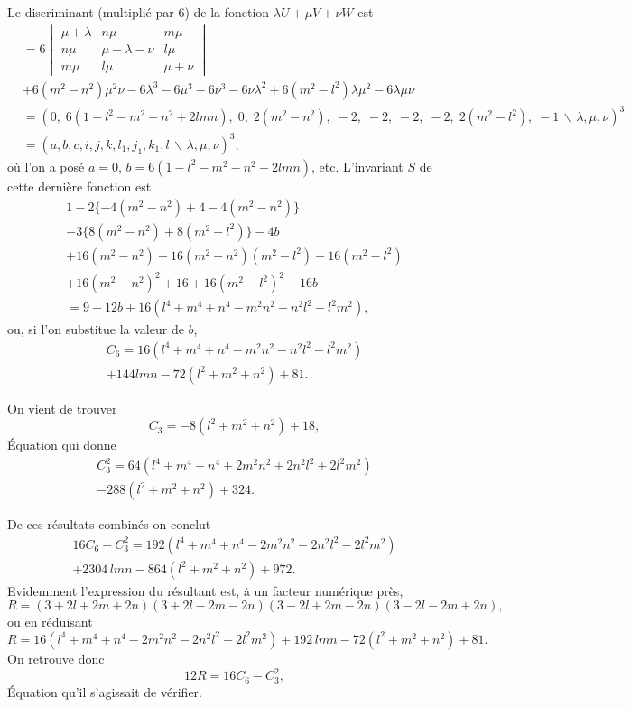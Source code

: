 \documentclass[11pt,a4paper]{book}
\begin{document}
Le discriminant (multipli\'{e} par $6$) de la fonction $\lambda U + \mu V + \nu W$ est
\begin{align*}
&= 6\begin{vmatrix}\mu+\lambda & n\mu & m\mu \\ n\mu & \mu-\lambda-\nu & l\mu \\ m\mu & l\mu & \mu+\nu\end{vmatrix} \\
&+ 6(m^{2}-n^{2})\mu^{2}\nu - 6\lambda^{3} - 6\mu^{3} - 6\nu^{3} - 6\nu\lambda^{2}
+ 6(m^{2}-l^{2})\lambda\mu^{2} - 6\lambda\mu\nu \\
&= (0,\; 6(1-l^{2}-m^{2}-n^{2}+2lmn),\; 0,\; 2(m^{2}-n^{2}),\; -2,\; -2,\; -2,\; -2,\; 2(m^{2}-l^{2}),\; -1\,\backslash\!\!\,\lambda,\mu,\nu)^{3} \\
&= (a,b,c,i,j,k,l_{1},j_{1},k_{1},l\,\backslash\!\!\,\lambda,\mu,\nu)^{3},
\end{align*}
o\`{u} l'on a pos\'{e} $a=0$, $b = 6(1-l^{2}-m^{2}-n^{2}+2lmn)$, etc.
L'invariant $S$ de cette derni\`{e}re fonction est
\begin{multline*}
1 - 2\{-4(m^{2}-n^{2})+4-4(m^{2}-n^{2})\} \\
- 3\{8(m^{2}-n^{2})+8(m^{2}-l^{2})\} - 4b \\
+ 16(m^{2}-n^{2}) - 16(m^{2}-n^{2})(m^{2}-l^{2}) + 16(m^{2}-l^{2}) \\
+ 16(m^{2}-n^{2})^{2} + 16 + 16(m^{2}-l^{2})^{2} + 16b \\
= 9 + 12b + 16(l^{4}+m^{4}+n^{4}-m^{2}n^{2}-n^{2}l^{2}-l^{2}m^{2}),
\end{multline*}
ou, si l'on substitue la valeur de $b$,
\begin{multline*}
C_{6} = 16(l^{4}+m^{4}+n^{4}-m^{2}n^{2}-n^{2}l^{2}-l^{2}m^{2}) \\
+ 144lmn - 72(l^{2}+m^{2}+n^{2}) + 81.
\end{multline*}

On vient de trouver
\[C_{3} = -8(l^{2}+m^{2}+n^{2})+18,\]
\'{E}quation qui donne
\begin{multline*}
C_{3}^{2} = 64(l^{4}+m^{4}+n^{4}+2m^{2}n^{2}+2n^{2}l^{2}+2l^{2}m^{2}) \\
- 288(l^{2}+m^{2}+n^{2}) + 324.
\end{multline*}

\newpage

De ces r\'{e}sultats combin\'{e}s on conclut
\begin{multline*}
16C_{6} - C_{3}^{2} = 192(l^{4}+m^{4}+n^{4}-2m^{2}n^{2}-2n^{2}l^{2}-2l^{2}m^{2}) \\
+ 2304\,lmn - 864(l^{2}+m^{2}+n^{2}) + 972.
\end{multline*}
Evidemment l'expression du r\'{e}sultant est, \`{a} un facteur num\'{e}rique pr\`{e}s,
\[R = (3+2l+2m+2n)(3+2l-2m-2n)(3-2l+2m-2n)(3-2l-2m+2n),\]
ou en r\'{e}duisant
\[R = 16(l^{4}+m^{4}+n^{4}-2m^{2}n^{2}-2n^{2}l^{2}-2l^{2}m^{2}) + 192\,lmn - 72(l^{2}+m^{2}+n^{2}) + 81.\]
On retrouve donc
\[12R = 16C_{6} - C_{3}^{2},\]
\'{E}quation qu'il s'agissait de v\'{e}rifier.
\end{document}
